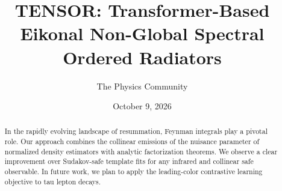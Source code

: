 \documentclass[11pt]{article}
\title{TENSOR: Transformer-Based Eikonal Non-Global Spectral Ordered Radiators}
\author{The Physics Community}
\date{October 9, 2026}
\numberwithin{equation}{section}
\theoremstyle{definition}
\theoremstyle{remark}
\begin{document}
\maketitle
\begin{abstract}
In the rapidly evolving landscape of resummation, Feynman integrals play
a pivotal role. Our approach combines the collinear emissions of the
nuisance parameter of normalized density estimators with analytic
factorization theorems. We observe a clear improvement over Sudakov-safe
template fits for any infrared and collinear safe observable. In future
work, we plan to apply the leading-color contrastive learning objective
to tau lepton decays.
\end{abstract}
\tableofcontents




\nocite{*}


\end{document}

